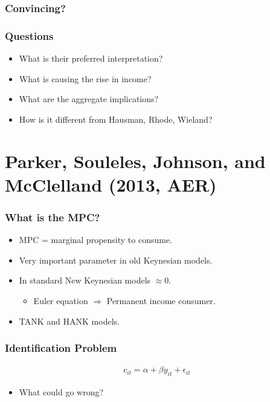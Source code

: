 \documentclass[english,xcolor=svgnames]{beamer}
\begin{document}
\begin{frame}
\frametitle[alignment=center]{Convincing?}

\end{frame}

\begin{frame}
\frametitle[alignment=center]{Questions}
\begin{itemize}
	\item What is their preferred interpretation?
	\item What is causing the rise in income?
\item What are the aggregate implications?
	\item How is it different from Hausman, Rhode, Wieland?
\end{itemize}
\end{frame}



\section{Parker, Souleles, Johnson, and McClelland (2013, AER)}

\begin{frame}
\frametitle[alignment=center]{What is the MPC?}
\begin{itemize}
	\item MPC = marginal propensity to consume.
	\item Very important parameter in old Keynesian models.
	\item In standard New Keynesian models $\approx 0$.
	\begin{itemize}
		\item Euler equation $\Rightarrow$ Permanent income consumer.
	\end{itemize}
	\item TANK and HANK models.
\end{itemize}
\end{frame}

\begin{frame}
\frametitle[alignment=center]{Identification Problem}
\begin{align*}
	c_{it}  = \alpha + \beta y_{it} + \epsilon_{it}
\end{align*}
\begin{itemize}
	\item What could go wrong?
\end{itemize}
\end{frame}
\end{document}
